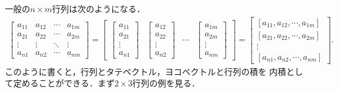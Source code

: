 \documentclass[11pt, a4paper, dvipdfmx]{jsarticle}
\theoremstyle{definition}
\theoremstyle{mystyle}
\numberwithin{equation}{section} %
\begin{document}
一般の$n\times m$行列は次のようになる．
\begin{align*}
    \begin{bmatrix}
        a_{11}&a_{12}&\cdots&a_{1m}\\
        a_{21}&a_{22}&\cdots&a_{2m}\\
        \vdots&\vdots&\ddots&\vdots\\
        a_{n1}&a_{n2}&\cdots&a_{nm}
    \end{bmatrix}
    =\begin{bmatrix}
     \begin{bmatrix}
        a_{11}\\a_{21}\\\vdots\\a_{n1}
     \end{bmatrix}&\begin{bmatrix}
        a_{12}\\a_{22}\\\vdots\\a_{n2} 
     \end{bmatrix}&\cdots
     &\begin{bmatrix}
        a_{1m}\\a_{2m}\\\vdots\\a_{nm}
     \end{bmatrix}   
    \end{bmatrix}
    =\begin{bmatrix}
        [a_{11},a_{12},\cdots,a_{1m}]\\
        [a_{21},a_{22},\cdots,a_{2m}]\\
        \vdots\\
        [a_{n1},a_{n2},\cdots,a_{nm}]
    \end{bmatrix}.
\end{align*}
このように書くと，行列とタテベクトル，ヨコベクトルと行列の積を
内積として定めることができる．まず$2\times3$行列の例を見る．
\end{document}
